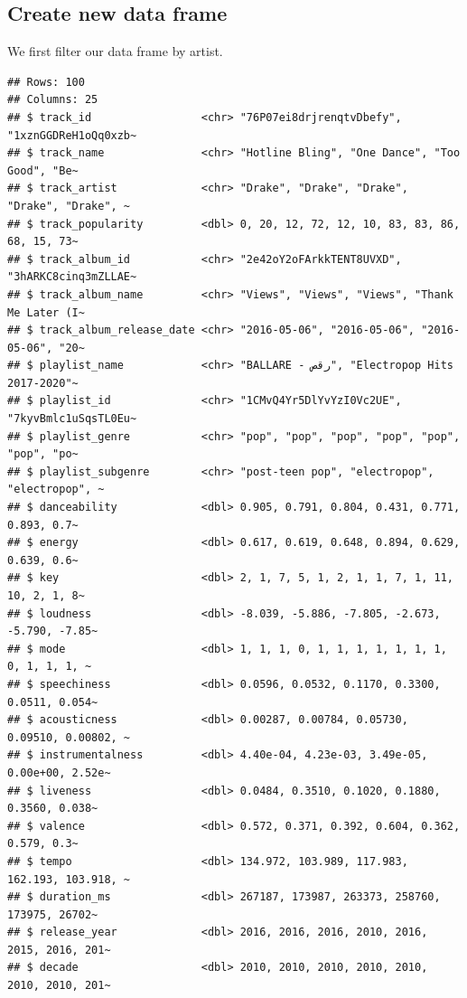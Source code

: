 \documentclass[
]{book}
\newenvironment{Shaded}{\begin{snugshade}}{\end{snugshade}}
\newcommand{\CommentTok}[1]{\textcolor[rgb]{0.56,0.35,0.01}{\textit{#1}}}
\newcommand{\KeywordTok}[1]{\textcolor[rgb]{0.13,0.29,0.53}{\textbf{#1}}}
\newcommand{\NormalTok}[1]{#1}
\newcommand{\OperatorTok}[1]{\textcolor[rgb]{0.81,0.36,0.00}{\textbf{#1}}}
\newcommand{\StringTok}[1]{\textcolor[rgb]{0.31,0.60,0.02}{#1}}
\begin{document}
\hypertarget{create-new-data-frame}{%
\subsection{Create new data frame}\label{create-new-data-frame}}

We first filter our data frame by artist.

\begin{Shaded}
\end{Shaded}

\begin{verbatim}
## Rows: 100
## Columns: 25
## $ track_id                 <chr> "76P07ei8drjrenqtvDbefy", "1xznGGDReH1oQq0xzb~
## $ track_name               <chr> "Hotline Bling", "One Dance", "Too Good", "Be~
## $ track_artist             <chr> "Drake", "Drake", "Drake", "Drake", "Drake", ~
## $ track_popularity         <dbl> 0, 20, 12, 72, 12, 10, 83, 83, 86, 68, 15, 73~
## $ track_album_id           <chr> "2e42oY2oFArkkTENT8UVXD", "3hARKC8cinq3mZLLAE~
## $ track_album_name         <chr> "Views", "Views", "Views", "Thank Me Later (I~
## $ track_album_release_date <chr> "2016-05-06", "2016-05-06", "2016-05-06", "20~
## $ playlist_name            <chr> "BALLARE - رقص", "Electropop Hits  2017-2020"~
## $ playlist_id              <chr> "1CMvQ4Yr5DlYvYzI0Vc2UE", "7kyvBmlc1uSqsTL0Eu~
## $ playlist_genre           <chr> "pop", "pop", "pop", "pop", "pop", "pop", "po~
## $ playlist_subgenre        <chr> "post-teen pop", "electropop", "electropop", ~
## $ danceability             <dbl> 0.905, 0.791, 0.804, 0.431, 0.771, 0.893, 0.7~
## $ energy                   <dbl> 0.617, 0.619, 0.648, 0.894, 0.629, 0.639, 0.6~
## $ key                      <dbl> 2, 1, 7, 5, 1, 2, 1, 1, 7, 1, 11, 10, 2, 1, 8~
## $ loudness                 <dbl> -8.039, -5.886, -7.805, -2.673, -5.790, -7.85~
## $ mode                     <dbl> 1, 1, 1, 0, 1, 1, 1, 1, 1, 1, 1, 0, 1, 1, 1, ~
## $ speechiness              <dbl> 0.0596, 0.0532, 0.1170, 0.3300, 0.0511, 0.054~
## $ acousticness             <dbl> 0.00287, 0.00784, 0.05730, 0.09510, 0.00802, ~
## $ instrumentalness         <dbl> 4.40e-04, 4.23e-03, 3.49e-05, 0.00e+00, 2.52e~
## $ liveness                 <dbl> 0.0484, 0.3510, 0.1020, 0.1880, 0.3560, 0.038~
## $ valence                  <dbl> 0.572, 0.371, 0.392, 0.604, 0.362, 0.579, 0.3~
## $ tempo                    <dbl> 134.972, 103.989, 117.983, 162.193, 103.918, ~
## $ duration_ms              <dbl> 267187, 173987, 263373, 258760, 173975, 26702~
## $ release_year             <dbl> 2016, 2016, 2016, 2010, 2016, 2015, 2016, 201~
## $ decade                   <dbl> 2010, 2010, 2010, 2010, 2010, 2010, 2010, 201~
\end{verbatim}
\end{document}
